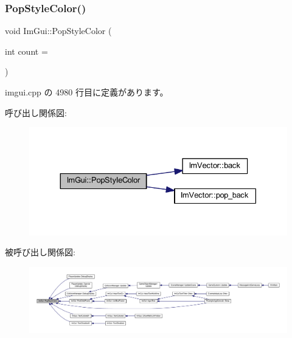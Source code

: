 \mbox{\label{namespace_im_gui_a9795f730b4043a98b6254738d86efcdc}} 
\subsubsection{\texorpdfstring{Pop\+Style\+Color()}{PopStyleColor()}}
{\footnotesize\ttfamily void Im\+Gui\+::\+Pop\+Style\+Color (\begin{DoxyParamCaption}\item[{int}]{count = {} }\end{DoxyParamCaption})}



 imgui.\+cpp の 4980 行目に定義があります。

呼び出し関係図\+:\nopagebreak
\begin{figure}[H]
\begin{center}
\leavevmode
\includegraphics[width=330pt]{namespace_im_gui_a9795f730b4043a98b6254738d86efcdc_cgraph}
\end{center}
\end{figure}
被呼び出し関係図\+:
\nopagebreak
\begin{figure}[H]
\begin{center}
\leavevmode
\includegraphics[width=350pt]{namespace_im_gui_a9795f730b4043a98b6254738d86efcdc_icgraph}
\end{center}
\end{figure}
\mbox{\label{namespace_im_gui_a14116e57d81e326adef2a702e65781d4}} 
